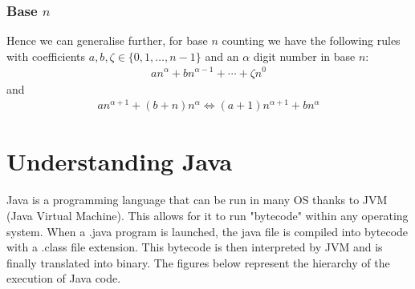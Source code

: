 \documentclass[11pt,a4 paper]{book}
\theoremstyle{plain}
\theoremstyle{definition}
\theoremstyle{remark}
\begin{document}
\begin{flushleft}
\subsection{Base $n$}
Hence we can generalise further, for base $n$ counting we have the following rules with coefficients $a,b,\zeta \in \{0,1,\ldots,n-1\}$ and an $\alpha$ digit number in base $n$:
\begin{align}
an^{\alpha}+bn^{\alpha-1}+\cdots+\zeta n^0
\end{align}
and
\begin{align}
an^{\alpha+1}+(b+n)n^\alpha \iff (a+1)n^{\alpha+1}+bn^\alpha
\end{align}
\chapter{Understanding Java}
Java is a programming language that can be run in many OS thanks to JVM (Java Virtual Machine). This allows for it to run "bytecode" within any operating system. When a .java program is launched, the java file is compiled into bytecode with a .class file extension. This bytecode is then interpreted by JVM and is finally translated into binary. The figures below represent the hierarchy of the execution of Java code.
\begin{figure}[H]
\centering
{}


\end{figure}
\end{flushleft}
\end{document}
